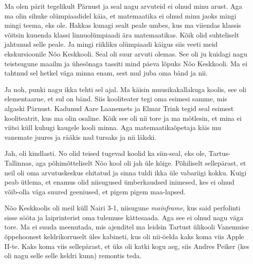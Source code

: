 

Ma olen pärit tegelikult Pärnust ja seal nagu arvuteid ei olnud minu arust. Aga ma olin sihuke olümpiaadidel käia, et matemaatika ei olnud minu jaoks mingi mingi teema, eks ole. Hakkas kunagi sealt peale umbes, kus ma viiendas klassis võitsin kuuenda klassi linnuolümpiaadi ära matemaatikas. Kõik olid suhteliselt jahtunud selle peale. Ja mingi riikliku olümpiaadi käigus siis veeti meid ekskursioonile Nõo Keskkooli. Seal oli suur arvuti olemas. See oli ju kuidagi nagu teistsugune maailm ja ühesõnaga tassiti mind päeva lõpuks Nõo Keskkooli. Ma ei tahtnud sel hetkel väga minna enam, sest mul juba oma bänd ja nii.


Ja noh, punki nagu ikka tehti sel ajal. Ma käisin muusikakallakuga koolis, see oli elementaarne, et sul on bänd. Siis kooliteater tegi oma esimesi samme, mis algaski Pärnust. Kadunud Aare Laanemets ja Elmar Trink tegid seal esimest kooliteatrit, kus ma olin osaline. Kõik see oli nii tore ja ma mõtlesin, et mina ei viitsi küll kuhugi kaugele kooli minna. Aga matemaatikaõpetaja käis mu vanemate juures ja rääkis nad tursaks ja nii läkski. 


Jah, oli kindlasti. No olid teised tugevad koolid ka siin-seal, eks ole, Tartus-Tallinnas,  aga põhimõtteliselt Nõo kool oli jah üle kõige. Põhiliselt sellepärast, et neil oli oma arvutuskeskus ehitatud ja sinna  tuldi ikka üle vabariigi kokku. Kuigi peab ütlema, et enamus olid niisugused ümberkaudsed inimesed, kes ei olnud võib-olla väga suured geeniused, et pigem pigem maa-lapsed. 

Nõo Keskkoolis oli meil küll Nairi 3-1, niisugune \emph{mainframe}, kus said perfolinti sisse sööta ja laiprinterist oma tulemuse kättesaada. Aga see ei olnud nagu väga tore. Ma ei suuda meenutada, mis ajenditel ma leidsin Tartust ülikooli Vanemuise õppehoonest  keldrikorruselt üles kabineti, kus oli nii-öelda kaks koma viis Apple II-te. Kaks koma viis sellepärast, et üks oli katki kogu aeg, siis Andres Peiker (kes oli nagu selle selle keldri kunn) remontis teda.

